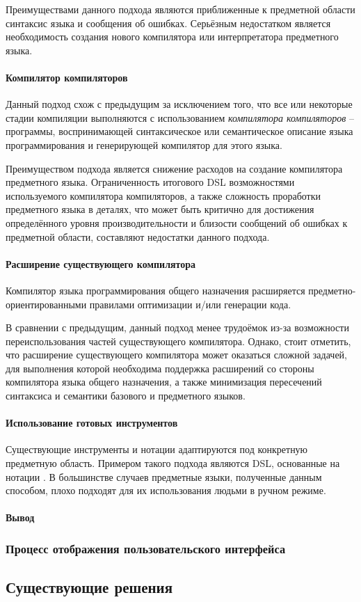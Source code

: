 Преимуществами данного подхода являются приближенные к предметной
области синтаксис языка и сообщения об ошибках. Серьёзным недостатком
является необходимость создания нового компилятора или интерпретатора
предметного языка.

\paragraph{Компилятор компиляторов}
Данный подход схож с предыдущим за исключением того, что все или некоторые
стадии компиляции выполняются с использованием \textit{компилятора компиляторов} -- программы, воспринимающей синтаксическое или семантическое
описание языка программирования и генерирующей компилятор для этого языка.

Преимуществом подхода является снижение расходов на создание компилятора
предметного языка. Ограниченность итогового DSL возможностями используемого
компилятора компиляторов, а также сложность проработки предметного языка в
деталях, что может быть критично для достижения определённого уровня
производительности и близости сообщений об ошибках к предметной области,
составляют недостатки данного подхода.

\paragraph{Расширение существующего компилятора}
Компилятор языка программирования общего назначения расширяется
предметно-ориенти\-рованными правилами оптимизации и/или генерации кода.

В сравнении с предыдущим, данный подход менее трудоёмок из-за возможности
переиспользования частей существующего компилятора. Однако, стоит отметить,
что расширение существующего компилятора может оказаться сложной задачей,
для выполнения которой необходима поддержка расширений со стороны
компилятора языка общего назначения, а также минимизация пересечений
синтаксиса и семантики базового и предметного языков.

\paragraph{Использование готовых инструментов}
Существующие инструменты и нотации адаптируются под конкретную предметную
область. Примером такого подхода являются DSL, основанные на нотации
. В большинстве случаев предметные языки, полученные данным
способом, плохо подходят для их использования людьми в ручном режиме.

\paragraph{Вывод}


\subsubsection{Процесс отображения пользовательского интерфейса}


\subsection{Существующие решения}
